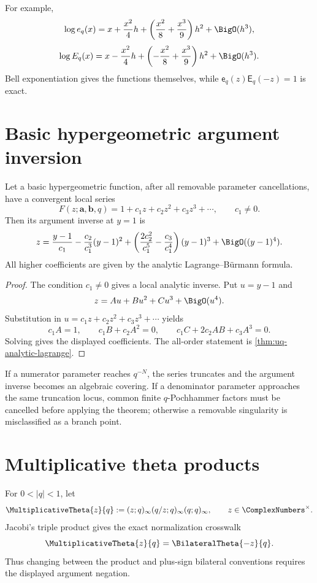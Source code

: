 For example,
\[
  \log e_q(x)
  =x+\frac{x^2}{4}h+
   \left(\frac{x^2}{8}+\frac{x^3}{9}\right)h^2+\BigO(h^3),
\]
\[
  \log E_q(x)
  =x-\frac{x^2}{4}h+
   \left(-\frac{x^2}{8}+\frac{x^3}{9}\right)h^2+\BigO(h^3).
\]
Bell exponentiation gives the functions themselves, while
\(\mathsf e_q(z)\mathsf E_q(-z)=1\) is exact.

\section{Basic hypergeometric argument inversion}
\label{sec:qs-hypergeometric}

\begin{theorem}
\label{thm:qs-hypergeometric-inverse}
Let a basic hypergeometric function, after all removable parameter
cancellations, have a convergent local series
\[
  F(z;\bm a,\bm b,q)
  =1+c_1z+c_2z^2+c_3z^3+\cdots,
  \qquad c_1\ne0.
\]
Then its argument inverse at \(y=1\) is
\[
  z=\frac{y-1}{c_1}
   -\frac{c_2}{c_1^3}(y-1)^2
   +\left(\frac{2c_2^2}{c_1^5}-\frac{c_3}{c_1^4}\right)(y-1)^3
   +\BigO((y-1)^4).
\]
All higher coefficients are given by the analytic Lagrange--Bürmann formula.
\end{theorem}

\begin{proof}
The condition \(c_1\ne0\) gives a local analytic inverse.  Put
\(u=y-1\) and
\[
  z=A u+B u^2+C u^3+\BigO(u^4).
\]
Substitution in \(u=c_1z+c_2z^2+c_3z^3+\cdots\) yields
\[
  c_1A=1,\qquad
  c_1B+c_2A^2=0,\qquad
  c_1C+2c_2AB+c_3A^3=0.
\]
Solving gives the displayed coefficients.  The all-order statement is
\cref{thm:uq-analytic-lagrange}.
\end{proof}

If a numerator parameter reaches \(q^{-N}\), the series truncates and the
argument inverse becomes an algebraic covering.  If a denominator parameter
approaches the same truncation locus, common finite \(q\)-Pochhammer factors
must be cancelled before applying the theorem; otherwise a removable
singularity is misclassified as a branch point.

\section{Multiplicative theta products}
\label{sec:qs-theta}

For \(0<|q|<1\), let
\[
  \MultiplicativeTheta{z}{q}
  :=(z;q)_\infty(q/z;q)_\infty(q;q)_\infty,
  \qquad z\in\ComplexNumbers^\times.
\]
Jacobi's triple product gives the exact normalization crosswalk
\[
 \MultiplicativeTheta{z}{q}=\BilateralTheta{-z}{q}.
\]
Thus changing between the product and plus-sign bilateral conventions
requires the displayed argument negation.

